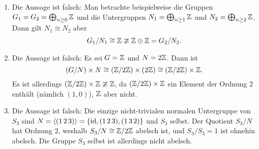 \begin{solution}
  \begin{enumerate}
    \item
      Die Aussage ist falsch:
      Man betrachte beispielweise die Gruppen $G_1 = G_2 = \bigoplus_{n \geq 0} \mathbb{Z}$ und die Untergruppen \mbox{$N_1 = \bigoplus_{n \geq 1} \mathbb{Z}$} und $N_2 = \bigoplus_{n \geq 2} \mathbb{Z}$.
      Dann gilt $N_1 \cong N_2$ aber
      \[
        G_1/N_1 \cong \mathbb{Z} \ncong \mathbb{Z} \oplus \mathbb{Z} = G_2/N_2.
      \]
    \item
      Die Aussage ist falsch:
      Es sei $G = \mathbb{Z}$ und $N = 2 \mathbb{Z}$.
      Dann ist
      \[
              (G/N) \times N
        \cong (\mathbb{Z} / 2 \mathbb{Z}) \times (2 \mathbb{Z})
        \cong (\mathbb{Z} / 2 \mathbb{Z}) \times \mathbb{Z}.
      \]
      Es ist allerdings $(\mathbb{Z} / 2 \mathbb{Z}) \times \mathbb{Z} \ncong \mathbb{Z}$, da $(\mathbb{Z} / 2 \mathbb{Z}) \times \mathbb{Z}$ ein Element der Ordnung $2$ enthält (nämlich $(1,0)$), $\mathbb{Z}$ aber nicht.
    \item
      Die Aussage ist falsch:
      Die einzige nicht-trivialen normalen Untergruppe von $S_3$ sind $N = \left\langle (1 \, 2 \, 3) \right\rangle = \{\operatorname{id}, (1 \, 2 \, 3), (1 \, 3 \, 2) \}$ und $S_3$ selbst.
      Der Quotient $S_3 / N$ hat Ordnung $2$, weshalb $S_3 / N \cong \mathbb{Z} / 2 \mathbb{Z}$ abelsch ist, und $S_3/S_3 = 1$ ist ohnehin abelsch.
      Die Gruppe $S_3$ selbst ist allerdings nicht abelsch.
      

\end{enumerate}
\end{solution}
